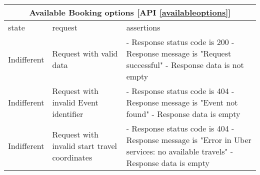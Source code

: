 \begin{center}
	\begin{tabular}{|p{}|p{}|p{}|}
		\hline
		\multicolumn{3}{c}{Available Booking options [API \ref{availableoptions}]}\\
		
		\hline
		state & request & assertions \\
		
		
		\hline
		Indifferent &
		Request with valid data & 
		- Response status code is 200 \newline
		- Response message is "Request successful" \newline
		- Response data is not empty
		\\
		
		\hline
		Indifferent &
		Request with invalid Event identifier & 
		- Response status code is 404 \newline
		- Response message is "Event not found" \newline
		- Response data is empty
		\\
		
		\hline
		Indifferent &
		Request with invalid start travel coordinates & 
		- Response status code is 404 \newline
		- Response message is "Error in Uber services: no available travels" \newline
		- Response data is empty
		\\
		
		\hline
	\end{tabular}
\end{center}

